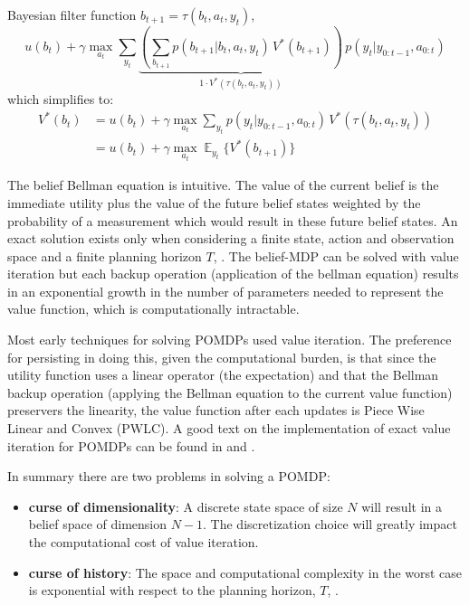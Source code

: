 Bayesian filter function $b_{t+1} = \tau(b_t,a_t,y_t)$,
\begin{equation}\label{eq:max_component}
u(b_t) + \gamma \max_{a_t} \sum_{y_t} \underbrace{\left( \sum_{b_{t+1}} p(b_{t+1}|b_t,a_t,y_t)\,V^*(b_{t+1})\right)}_{1 \cdot V^*(\tau(b_t,a_t,y_t))}\, p(y_t|y_{0:t-1},a_{0:t})
\end{equation}
which simplifies to:
\begin{align}\label{eq:final_belief_bellman}
  V^*(b_t) &= u(b_t) + \gamma \max_{a_t} \sum_{y_t}  p(y_t|y_{0:t-1},a_{0:t}) \,V^*(\tau(b_t,a_t,y_t))\nonumber  \\ 
	   &= u(b_t) + \gamma \max_{a_t} \displaystyle \mathop{\mathbb{E}}_{y_t}\{V^*(b_{t+1})\}
\end{align}

The belief Bellman equation is intuitive. The value of the current belief is the immediate utility plus the value of the 
future belief states weighted by the probability of a measurement which would result in these future belief states. 
An exact solution exists only when considering a finite state, action and observation space and a finite planning horizon $T$, \cite{Sondik_1973}.
The belief-MDP can be solved with value iteration but each backup operation (application of the bellman equation) 
results in an exponential growth in the number of parameters needed to represent the value function, which 
is computationally intractable.

Most early techniques for solving POMDPs used value iteration. The preference for persisting in doing this, given the computational
burden, is that since the utility function uses a linear operator (the expectation) and that the Bellman backup operation 
(applying the Bellman equation to the current value function) preservers the linearity, the value function after each 
updates is Piece Wise Linear and Convex (PWLC). A good text on the implementation of exact value iteration for POMDPs can be 
found in \cite[Chap. 15]{Thrun_2005} and \cite{Kaelbling_1998}.

In summary there are two problems in solving a POMDP:
\begin{itemize}
 \item \textbf{curse of dimensionality}: A discrete state space of size $N$ will result in a belief space of dimension $N-1$. The discretization
 choice will greatly impact the computational cost of value iteration.
 \item \textbf{curse of history}: The space and computational complexity in the worst case is exponential with respect to the planning 
 horizon, $T$, \cite{POMDP_approach_2010}.
\end{itemize}

